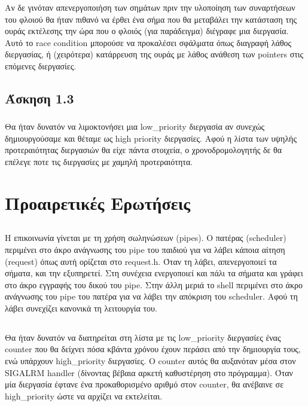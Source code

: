 \documentclass[a4paper,10pt]{article} \usepackage{anysize}
\begin{document}
\subsubsection{}
Αν δε γινόταν απενεργοποιήση των σημάτων πριν την υλοποίηση των συναρτήσεων
του φλοιού θα ήταν πιθανό να έρθει ένα σήμα που θα μεταβάλει την κατάσταση της
ουράς εκτέλεσης την ώρα που ο φλοιός (για παράδειγμα) διέγραφε μια διεργασία.
Αυτό το race condition μπορούσε να προκαλέσει σφάλματα όπως διαγραφή λάθος
διεργασίας, ή (χειρότερα) κατάρρευση της ουράς με λάθος ανάθεση των pointers
στις επόμενες διεργασίες.

\subsection{Άσκηση 1.3}
\subsubsection{}
Θα ήταν δυνατόν να λιμοκτονήσει μια low\_priority διεργασία αν συνεχώς
δημιουργούσαμε και θέταμε ως high priority διεργασίες. Αφού η λίστα των υψηλής
προτεραιότητας διεργασιών θα είχε πάντα στοιχεία, ο χρονοδρομολογητής δε θα
επέλεγε ποτε τις διεργασίες με χαμηλή προτεραιότητα.

\section*{Προαιρετικές Ερωτήσεις}
\setcounter{section}{4}
\setcounter{subsection}{0}
\subsection{}
Η επικοινωνία γίνεται με τη χρήση σωληνώσεων (pipes). Ο πατέρας (scheduler)
περιμένει στο άκρο ανάγνωσης του pipe του παιδιού για να λάβει κάποια αίτηση
(request) όπως αυτή ορίζεται στο request.h. Όταν τη λάβει, απενεργοποιεί τα σήματα,
και την εξυπηρετεί. Στη συνέχεια ενεργοποιεί και πάλι τα σήματα και γράφει στο άκρο
εγγραφής του δικού του pipe. Στην άλλη μεριά το shell περιμένει στο άκρο
ανάγνωσης του pipe του πατέρα για να λάβει την απόκριση του scheduler.
Αφού τη λάβει συνεχίζει κανονικά τη λειτουργία του.

\subsection{}
Θα ήταν δυνατόν να διατηρείται στη λίστα με τις low\_priority διεργασίες ένας
counter που θα δείχνει πόσα κβάντα χρόνου έχουν περάσει από την δημιουργία
τους, ενώ υπάρχουν high\_priority διεργασίες. Ο counter αυτός θα αυξανόταν μέσα
στον SIGALRM handler (δίνοντας βέβαια αρκετή καθυστέρηση στο πρόγραμμα). Όταν
μία διεργασία έφτανε ένα προκαθορισμένο αριθμό στον counter, θα ανέβαινε σε
high\_priority ώστε να αρχίζει να εκτελείται.
\end{document}
